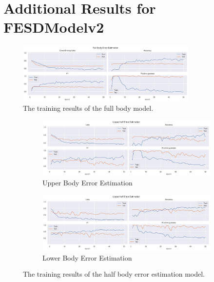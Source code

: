 
\chapter{Additional Results for FESDModelv2}

\begin{figure}[htbp]
  \centering
  \includegraphics[width=0.8\textwidth]{figures/Results/v2/fb/FullBody_ErrorEstimation.png}
  \caption[Full Body model training results]{The training results of the full body model.}
  \label{fig:full_body_training_results_v2}
\end{figure}

\begin{figure}[htbp]
  \centering
  \begin{subfigure}[b]{0.8\textwidth}
      \centering
      \includegraphics[width=\textwidth]{figures/Results/v2/hb/UpperBody_ErrorEstimation.png}
      \caption{Upper Body Error Estimation}
      \label{fig:uh_ee}
  \end{subfigure}
  \hfill
  \begin{subfigure}[b]{0.8\textwidth}
      \centering
      \includegraphics[width=\textwidth]{figures/Results/v2/hb/LowerBody_ErrorEstimation_uh.png}
      \caption{Lower Body Error Estimation}
      \label{fig:lh_ee}
  \end{subfigure}
  \caption[Half Body model training results]{The training results of the half body error estimation model.}
     \label{fig:half_body_training_results}
\end{figure}

